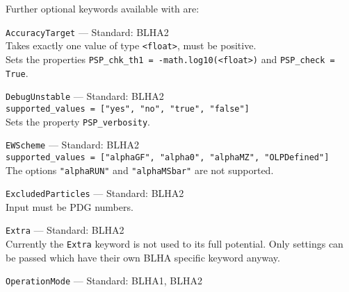 Further optional keywords available with \gosam are:
\begin{basedescript}{\desclabelstyle{\pushlabel}}
    \item[\hspace{-1em}]\colorbox{gray!30}{\lstinline[style=in]|AccuracyTarget|} --- Standard: BLHA2\vspace{0.1cm}\\
        Takes exactly one value of type \texttt{<float>}, must be positive.\\
        Sets the properties \lstinline[style=in]|PSP_chk_th1 = -math.log10(<float>)| and  \lstinline[style=in]|PSP_check = True|.
    \item[\hspace{-1em}]\colorbox{gray!30}{\lstinline[style=in]|DebugUnstable|} --- Standard: BLHA2\vspace{0.1cm}\\
        \lstinline[style=in]|supported_values = ["yes", "no", "true", "false"]|\\
        Sets the property \texttt{PSP\_verbosity}.
    \item[\hspace{-1em}]\colorbox{gray!30}{\lstinline[style=in]|EWScheme|} --- Standard: BLHA2\vspace{0.1cm}\\
        \lstinline[style=in]|supported_values = ["alphaGF", "alpha0", "alphaMZ", "OLPDefined"]|\\
        The options \texttt{"alphaRUN"} and \texttt{"alphaMSbar"} are not supported.
    \item[\hspace{-1em}]\colorbox{gray!30}{\lstinline[style=in]|ExcludedParticles|} --- Standard: BLHA2\vspace{0.1cm}\\
        Input must be PDG numbers.
    \item[\hspace{-1em}]\colorbox{gray!30}{\lstinline[style=in]|Extra|} --- Standard: BLHA2\vspace{0.1cm}\\
        Currently the \texttt{Extra} keyword is not used to its full potential. Only settings can be passed which have their own BLHA specific keyword anyway.
    \item[\hspace{-1em}]\colorbox{gray!30}{\lstinline[style=in]|OperationMode|} --- Standard: BLHA1, BLHA2\vspace{0.1cm}\\

\end{basedescript}

